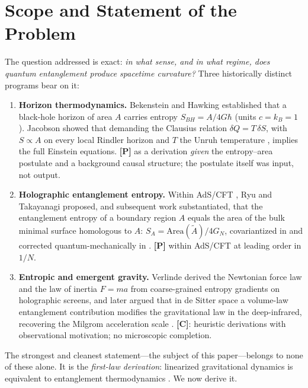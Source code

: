 \documentclass[11pt]{article}
\theoremstyle{definition}
\newcommand{\pP}{\textbf{[P]}}
\newcommand{\pC}{\textbf{[C]}}
\begin{document}
\section{Scope and Statement of the Problem}

The question addressed is exact: \emph{in what sense, and in what regime, does
quantum entanglement produce spacetime curvature?} Three historically distinct
programs bear on it:

\begin{enumerate}[itemsep=1pt]
\item \textbf{Horizon thermodynamics.} Bekenstein \cite{Bekenstein1973} and
Hawking \cite{Hawking1975} established that a black-hole horizon of area $A$
carries entropy $S_{BH}=A/4G\hbar$ (units $c=k_B=1$). Jacobson
\cite{Jacobson1995} showed that demanding the Clausius relation
$\delta Q=T\,\delta S$, with $S\propto A$ on every local Rindler horizon and
$T$ the Unruh temperature \cite{Unruh1976}, implies the full Einstein
equations. \pP{} as a derivation \emph{given} the entropy--area postulate and a
background causal structure; the postulate itself was input, not output.
\item \textbf{Holographic entanglement entropy.} Within AdS/CFT
\cite{Maldacena1998}, Ryu and Takayanagi \cite{RyuTakayanagi2006} proposed,
and subsequent work substantiated, that the entanglement entropy of a boundary
region $A$ equals the area of the bulk minimal surface homologous to $A$:
$S_A=\mathrm{Area}(\tilde A)/4G_N$, covariantized in \cite{HRT2007} and
corrected quantum-mechanically in \cite{FLM2013,EngelhardtWall2015}. \pP{}
within AdS/CFT at leading order in $1/N$.
\item \textbf{Entropic and emergent gravity.} Verlinde \cite{Verlinde2011}
derived the Newtonian force law and the law of inertia $F=ma$ from
coarse-grained entropy gradients on holographic screens, and later argued
\cite{Verlinde2017} that in de Sitter space a volume-law entanglement
contribution modifies the gravitational law in the deep-infrared, recovering
the Milgrom acceleration scale \cite{Milgrom1983}. \pC{}: heuristic
derivations with observational motivation; no microscopic completion.
\end{enumerate}

The strongest and cleanest statement---the subject of this paper---belongs to
none of these alone. It is the \emph{first-law derivation}: linearized
gravitational dynamics is equivalent to entanglement thermodynamics
\cite{Lashkari2014,Faulkner2014}. We now derive it.
\end{document}
